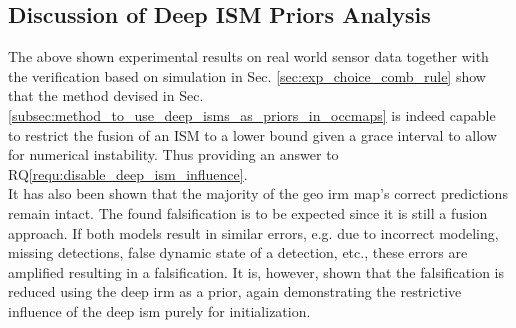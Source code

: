 \subsection{Discussion of Deep ISM Priors Analysis}
\label{subsec:discussion_of_prior_analy}
The above shown experimental results on real world sensor data together with the verification based on simulation in Sec. \ref{sec:exp_choice_comb_rule} show that the method devised in Sec. \ref{subsec:method_to_use_deep_isms_as_priors_in_occmaps} is indeed capable to restrict the fusion of an ISM to a lower bound given a grace interval to allow for numerical instability. Thus providing an answer to RQ\ref{requ:disable_deep_ism_influence}.\\
It has also been shown that the majority of the geo \gls{irm} map's correct predictions remain intact. The found falsification is to be expected since it is still a fusion approach. If both models result in similar errors, e.g. due to incorrect modeling, missing detections, false dynamic state of a detection, etc., these errors are amplified resulting in a falsification. It is, however, shown that the falsification is reduced using the deep \gls{irm} as a prior, again demonstrating the restrictive influence of the deep \gls{ism} purely for initialization.